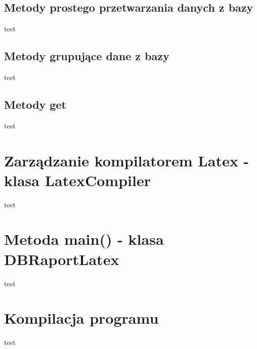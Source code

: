 \subsection{Metody prostego przetwarzania danych z bazy}

test
\subsection{Metody grupujące dane z bazy}

test
\subsection{Metody get}

test



\section{Zarządzanie kompilatorem Latex - klasa LatexCompiler}
test
\section{Metoda main() - klasa DBRaportLatex }
test
\section{Kompilacja programu}
test